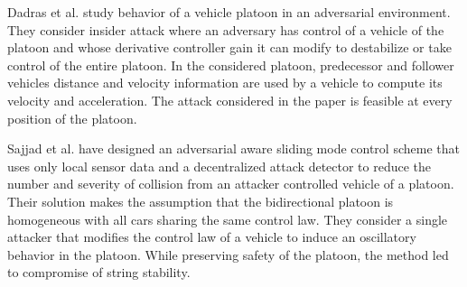 Dadras et al. \cite{DGRS15} study behavior of a vehicle platoon in an adversarial environment. They consider insider attack where an adversary has control of a vehicle of the platoon and whose derivative controller gain it can modify to destabilize or take control of the entire platoon. In the considered platoon, predecessor and follower vehicles distance and velocity information are used by a vehicle to compute its velocity and acceleration. The attack considered in the paper is feasible at every position of the platoon. 

Sajjad et al. \cite{SSDSG15} have designed an adversarial aware sliding mode control scheme that uses only local sensor data and a decentralized attack detector to reduce the number and severity of collision from an attacker controlled vehicle of a platoon. Their solution makes the assumption that the bidirectional platoon is homogeneous with all cars sharing the same control law. They consider a single attacker that modifies the control law of a vehicle to induce an oscillatory behavior in the platoon. While preserving safety of the platoon, the method led to compromise of string stability.     
